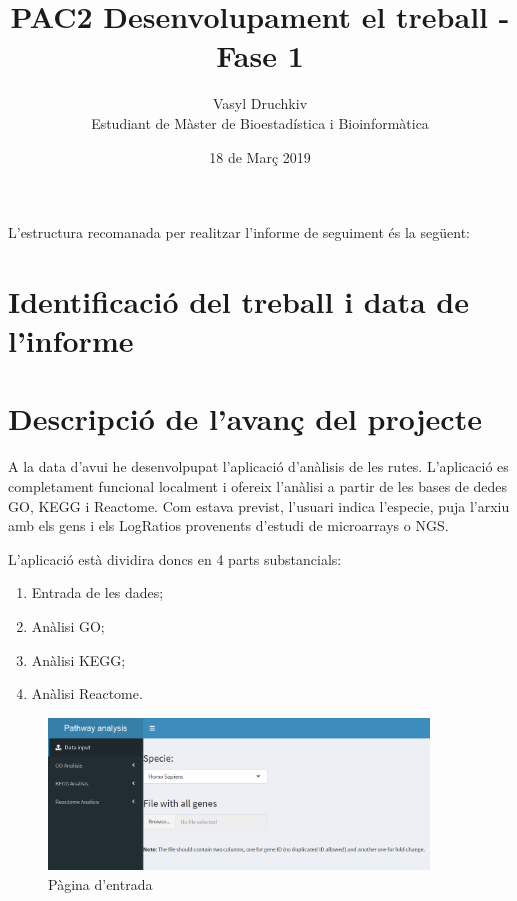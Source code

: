 \documentclass[]{article}
\title{PAC2  Desenvolupament el treball - Fase 1}
\date{18 de Març 2019}
\author{Vasyl Druchkiv \\ Estudiant de Màster de Bioestadística i Bioinformàtica}
\begin{document}
\maketitle
\makeatletter
\renewcommand{\@seccntformat}[1]{}
\makeatother
\begin{spacing}{0.1}
\tableofcontents
\end{spacing}

L'estructura recomanada per realitzar l'informe de seguiment és la següent:

    \section{Identificació del treball i data de l'informe}

    \section{Descripció de l'avanç del projecte} 

A la data d'avui he desenvolpupat l'aplicació d'anàlisis de les rutes. L'aplicació es completament funcional localment i ofereix l'anàlisi a partir de les bases de dedes GO, KEGG i Reactome. Com estava previst, l'usuari indica l'especie, puja l'arxiu amb els gens i els LogRatios provenents d'estudi de microarrays o NGS. 

L'aplicació està dividira doncs en 4 parts substancials:

\begin{enumerate}
\item Entrada de les dades;
\item Anàlisi GO;
\item Anàlisi KEGG;
\item Anàlisi Reactome.
\end{enumerate}

\begin{figure}[h!]
\caption{Pàgina d'entrada}
\centering
\includegraphics[width=0.9\textwidth]{App_F1}
\end{figure}
\end{document}

